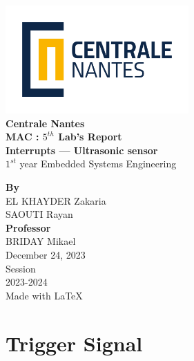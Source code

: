 \documentclass{article}
\begin{document}
\makeatletter
\begin{titlepage}
\begin{center}
    
\includegraphics[width=7cm]{assets/LogoCN_Q.png}
\\
\textbf{\large{Centrale Nantes}}
\\[2cm]

\textbf{\large{MAC : $5^{th}$ Lab's Report \\
Interrupts --- Ultrasonic sensor }}
\\[14pt]
$1^{st}$ year Embedded Systems Engineering
\\[2cm]


\vfill

\textbf{By} \\
EL KHAYDER Zakaria \\
SAOUTI Rayan
\\[1cm]

\textbf{Professor} \\
BRIDAY Mikael
\\[3cm]


December 24, 2023 \\ [12pt]

Session \\
2023-2024 \\[12pt]
\small{Made with \LaTeX}
\end{center}
\end{titlepage}
\makeatother

\pagebreak

\setcounter{page}{1}

\clearpage
{}
\tableofcontents

\clearpage
{}
\lstlistoflistings

\clearpage

\setcounter{page}{1}

\section{Trigger Signal}
\end{document}

